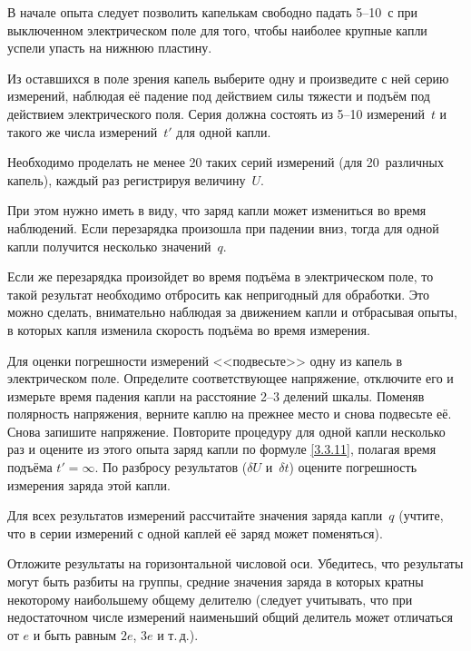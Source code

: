 \begin{lab:task}
\item В начале опыта следует позволить капелькам свободно падать 5--10~с 
при выключенном электрическом поле для того, чтобы наиболее крупные
капли успели упасть на нижнюю пластину.

Из оставшихся в поле зрения капель выберите одну и произведите с ней серию
измерений, наблюдая её падение под действием силы тяжести и подъём под действием
электрического поля. Серия должна состоять из 5--10 измерений~$t$ и такого
же числа измерений~$t'$ для одной капли.

\item Необходимо проделать не менее 20 таких серий измерений (для 20~различных
капель), каждый раз регистрируя величину~$U$. 

При этом нужно иметь в виду, что заряд капли может измениться во время наблюдений.
Если перезарядка произошла при падении вниз, тогда для одной
капли получится несколько значений~$q$.

Если же перезарядка произойдет во время подъёма в электрическом поле,
то такой результат необходимо отбросить как непригодный для обработки. 
Это можно сделать, внимательно наблюдая за движением капли и отбрасывая опыты, 
в которых капля изменила скорость подъёма во время измерения.

\item Для оценки погрешности измерений <<подвесьте>> одну из капель в электрическом
поле. Определите соответствующее напряжение, отключите его  и измерьте время
падения капли на расстояние 2--3 делений шкалы. Поменяв полярность
напряжения, верните каплю на прежнее место и снова подвесьте её. Снова запишите
напряжение. Повторите  процедуру  для одной капли несколько раз и 
оцените из этого опыта заряд капли по формуле \eqref{3.3.11}, полагая время
подъёма $t'=\infty$. 
По разбросу результатов ($\delta U$ и~$\delta t$) оцените
погрешность измерения заряда этой капли.


\item Для всех результатов измерений рассчитайте значения заряда капли~$q$
(учтите, что в серии измерений с одной каплей её заряд может поменяться).

\item Отложите результаты на горизонтальной числовой оси. Убедитесь, что
результаты могут быть разбиты на группы, средние значения заряда в которых
кратны некоторому наибольшему общему делителю
(следует учитывать, что при недостаточном числе измерений 
наименьший общий делитель может отличаться от $e$ и быть равным $2e$, $3e$ и т.\,д.).


\end{lab:task}
